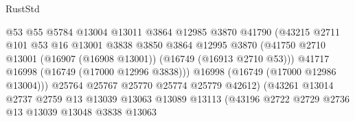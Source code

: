\begin{lexlean}{RustStd}
\begin{coremodule}
                                        @53
                                        @55
                                        @5784
                                        @13004
                                        @13011
                                        @3864
                                        @12985
                                        @3870
                                        @41790
                                        (@43215
                                          @2711
                                          @101
                                          @53
                                          @16
                                          @13001
                                          @3838
                                          @3850
                                          @3864
                                          @12995
                                          @3870
                                          (@41750
                                            @2710
                                            @13001
                                            (@16907 (@16908 @13001))
                                            (@16749 (@16913 @2710 @53)))
                                          @41717
                                          @16998
                                          (@16749 (@17000 @12996 @3838)))
                                        @16998
                                        (@16749 (@17000 @12986 @13004)))
                                      @25764
                                      @25767
                                      @25770
                                      @25774
                                      @25779
                                      @42612)
                                    (@43261
                                      @13014
                                      @2737
                                      @2759
                                      @13
                                      @13039
                                      @13063
                                      @13089
                                      @13113
                                      (@43196
                                        @2722
                                        @2729
                                        @2736
                                        @13
                                        @13039
                                        @13048
                                        @3838
                                        @13063

\end{coremodule}
\end{lexlean}
